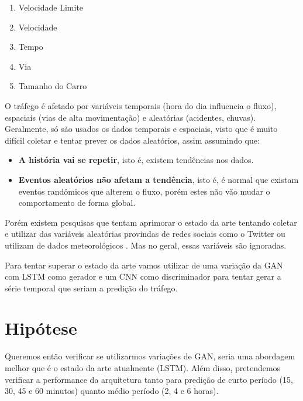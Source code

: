 \begin{enumerate}
    \item Velocidade Limite
    \item Velocidade
    \item Tempo
    \item Via
    \item Tamanho do Carro
\end{enumerate}


O tráfego é afetado por variáveis temporais (hora do dia influencia o fluxo), espaciais (vias de alta movimentação) e aleatórias (acidentes, chuvas). Geralmente, só são usados os dados temporais e espaciais, visto que é muito difícil coletar e tentar prever os dados aleatórios, assim assumindo que:
\begin{itemize}
    \item \textbf{A história vai se repetir}, isto é, existem tendências nos dados.
    \item \textbf{Eventos aleatórios não afetam a tendência}, isto é, é normal que existam eventos randômicos que alterem o fluxo, porém estes não vão mudar o comportamento de forma global.
\end{itemize}

Porém existem pesquisas que tentam aprimorar o estado da arte tentando coletar e utilizar das variáveis aleatórias provindas de redes sociais como o Twitter \cite{he2013improving} ou utilizam de dados meteorológicos \cite{wang_2018}. Mas no geral, essas variáveis são ignoradas.

Para tentar superar o estado da arte vamos utilizar de uma variação da \acrshort{GAN} com \acrshort{LSTM} como gerador e um \acrshort{CNN} como discriminador para tentar gerar a série temporal que seriam a predição do tráfego.


\section{Hipótese}
Queremos então verificar se utilizarmos variações de \acrshort{GAN}, seria uma abordagem melhor que é o estado da arte atualmente (\acrshort{LSTM}). Além disso, pretendemos verificar a performance da arquitetura tanto para predição de curto período (15, 30, 45 e 60 minutos) quanto médio período (2, 4 e 6 horas).

